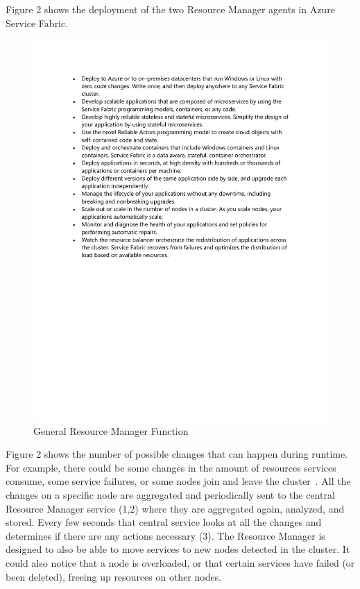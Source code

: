 Figure 2 shows the deployment of the two Resource Manager agents in
Azure Service Fabric.

\begin{figure}[!ht]
  \centering\includegraphics[width=\columnwidth]{images/fig2.pdf}
  \caption{General Resource Manager Function~\cite{hid-sp18-501-fig2and3}}
\label{f:architecture}
\end{figure}

Figure 2 shows the number of possible changes that can happen during
runtime.  For example, there could be some changes in the amount of
resources services consume, some service failures, or some nodes join
and leave the cluster~\cite{hid-sp18-501-fig2and3}.  All the changes
on a specific node are aggregated and periodically sent to the central
Resource Manager service (1,2) where they are aggregated again,
analyzed, and stored.  Every few seconds that central service looks at
all the changes and determines if there are any actions necessary
(3). The Resource Manager is designed to also be able to move services
to new nodes detected in the cluster. It could also notice that a node
is overloaded, or that certain services have failed (or been deleted),
freeing up resources on other nodes.

